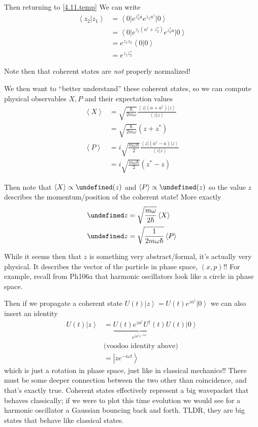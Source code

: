 \documentclass[10pt]{report}
\newcommand{\bra}[1]{\left<#1\right|}
\newcommand{\ket}[1]{\left|#1\right>}
\newcommand{\dotp}[2]{\left<#1\left.\right|#2\right>}
\newcommand{\expvalue}[1]{\left<#1\right>}
\let\Re\undefined
\let\Im\undefined
\DeclareMathOperator{\Re}{Re}
\DeclareMathOperator{\Im}{Im}
\begin{document}
Then returning to \eqref{4.11.temp} We can write
\begin{align}
    \dotp{z_2}{z_1} &= \bra{0}e^{z_2^*a}e^{z_1a^\dagger}\ket{0}\\
    &= \bra{0}e^{z_1(a^\dagger + z_2^*)}e^{z_2^*a}\ket{0}\\
    &= e^{z_1z_2}\dotp{0}{0}\\
    &=e^{z_1z_2^*}
\end{align}

Note then that coherent states are \emph{not} properly normalized!

We then want to ``better understand'' these coherent states, so we can compute physical observables $X, P$ and their expectation values
\begin{align}
    \expvalue{X} &= \sqrt{\frac{\hbar}{2m\omega}}\frac{\bra{z}(a + a^\dagger)\ket{z}}{\dotp{z}{z}}\\
    &= \sqrt{\frac{\hbar}{2m\omega}}(z+z^*)\\
    \expvalue{P} &= i\sqrt{\frac{m\omega\hbar}{2}}\frac{\bra{z}(a^\dagger - a)\ket{z}}{\dotp{z}{z}}\\
    &= i\sqrt{\frac{m\omega\hbar}{2}}(z^* - z)
\end{align}

Then note that $\expvalue{X} \propto \Re(z)$ and $\expvalue{P} \propto \Im(z)$ so the value $z$ describes the momentum/position of the coherent state! More exactly
\begin{align}
    \Re z &= \sqrt{\frac{m\omega}{2\hbar}}\expvalue{X}\\
    \Im z &= \sqrt{\frac{1}{2m\omega\hbar}}\expvalue{P}
\end{align}

While it seems then that $z$ is something very abstract/formal, it's actually very physical. It describes the vector of the particle in phase space, $(x,p)$!! For example, recall from Ph106a that harmonic oscillators look like a circle in phase space.

Then if we propagate a coherent state $U(t)\ket{z} = U(t)e^{za^\dagger}\ket{0}$ we can also insert an identity
\begin{align}
    U(t)\ket{z} &= \underbrace{U(t)e^{za^\dagger}U^\dagger(t)}_{e^{za^\dagger e^{-i\omega t}}} U(t)\ket{0}\\
    &\text{(voodoo identity above)}\\
    &= \ket{ze^{-i\omega t}}
\end{align}
which is just a rotation in phase space, just like in classical mechanics!! There must be some deeper connection between the two other than coincidence, and that's exactly true. Coherent states effectively represent a big wavepacket that behaves classically; if we were to plot this time evolution we would see for a harmonic oscillator a Gaussian bouncing back and forth. TLDR, they are big states that behave like classical states.
\end{document}
